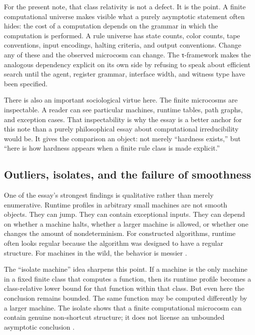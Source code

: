 \documentclass{pantarhei-researchnote}
\begin{document}
For the present note, that class relativity is not a defect. It is the
point. A finite computational universe makes visible what a purely
asymptotic statement often hides: the cost of a computation depends on
the grammar in which the computation is performed. A rule universe has
state counts, color counts, tape conventions, input encodings, halting
criteria, and output conventions. Change any of these and the observed
microcosm can change. The τ-framework makes the analogous dependency
explicit on its own side by refusing to speak about efficient search
until the agent, register grammar, interface width, and witness type have
been specified.

There is also an important sociological virtue here. The finite
microcosms are inspectable. A reader can see particular machines, runtime
tables, path graphs, and exception cases. That inspectability is why the
essay is a better anchor for this note than a purely philosophical essay
about computational irreducibility would be. It gives the comparison an
object: not merely ``hardness exists,'' but ``here is how hardness appears
when a finite rule class is made explicit.''

\subsection{Outliers, isolates, and the failure of smoothness}

One of the essay's strongest findings is qualitative rather than merely
enumerative. Runtime profiles in arbitrary small machines are not smooth
objects. They can jump. They can contain exceptional inputs. They can
depend on whether a machine halts, whether a larger machine is allowed, or
whether one changes the amount of nondeterminism. For constructed
algorithms, runtime often looks regular because the algorithm was designed
to have a regular structure. For machines in the wild, the behavior is
messier \cite{Wolfram2026RuliologicalPNP}.

The ``isolate machine'' idea sharpens this point. If a machine is the only
machine in a fixed finite class that computes a function, then its runtime
profile becomes a class-relative lower bound for that function within that
class. But even here the conclusion remains bounded. The same function may
be computed differently by a larger machine. The isolate shows that a
finite computational microcosm can contain genuine non-shortcut structure;
it does not license an unbounded asymptotic conclusion
\cite{Wolfram2026RuliologicalPNP}.
\end{document}
